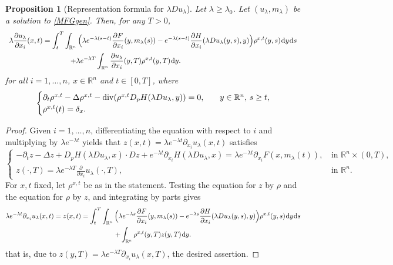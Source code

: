 \documentclass{amsart}
\newtheorem{prop}[thm]{Proposition}
\theoremstyle{remark}
\theoremstyle{definition}
\theoremstyle{Claim}
\newcommand{\R}{\mathbb{R}}
\newcommand{\dd}{\hspace{0.7pt}{\rm d}}
\theoremstyle{plain}
\begin{document}
	\begin{prop}[Representation formula for $\lambda Du_\lambda$]
		Let $\lambda\ge\lambda_0$. Let $(u_\lambda,m_\lambda)$ be a solution to \eqref{MFGgen}.
		Then, for any $T>0$,
		\begin{equation}\label{deru3gen}
				\begin{array}{l}
					\vspace{0.2cm}\displaystyle{\lambda \frac{\partial u_\lambda}{\partial x_i} (x,t)  = \int_{t}^{T}  \int_{\R^n} \Big(\lambda e^{-\lambda (s-t)} \frac{\partial F}{\partial x_i}(y,m_\lambda(s)) - e^{-\lambda (s-t)}\frac{\partial H}{\partial x_i} (\lambda Du_\lambda(y,s),y) \Big) \rho^{x, t}(y,s) \dd y \dd s}\\
					\displaystyle{\hspace{3cm}+\lambda e^{-\lambda T}\int_{\mathbb{R}^n}\frac{\partial u_\lambda}{\partial x_i}(y,T)\rho^{x, t}(y,T)\dd y}.
				\end{array}
		\end{equation}
			for all $i=1,\dots,n$, $x\in \mathbb{R}^n$ and $t\in [0,T]$, where 
		\[
		\begin{cases}
			\partial_t\rho^{x, t}-\Delta \rho^{x, t}-{ \rm div}(\rho^{x, t}D_pH(\lambda Du_\lambda,y))=0,\quad &y\in \mathbb{R}^n,\,{s\geq t},\\
			\rho^{x, t}(t)=\delta_{x}.
		\end{cases}
		\]
	\end{prop} 
	
	\begin{proof} Given $i=1,\dots,n$, differentiating the equation with respect to $i$ and multiplying by $\lambda e^{-\lambda t}$ yields that $z(x,t) = \lambda e^{-\lambda t}\partial_{x_i} u_\lambda(x,t)$ satisfies
	\[
	\begin{cases}
			-\partial_t z-\Delta z+D_p H(\lambda Du_\lambda,x) \cdot Dz + e^{-\lambda t}\partial_{x_i} H(\lambda Du_\lambda,x) = \lambda e^{-\lambda t} \partial_{x_i} F(x,m_\lambda(t)),\, & \text{in $\mathbb{R}^n \times (0,T)$},\\
			z(\cdot,T)=\lambda e^{-\lambda T}\frac{\partial}{\partial x_i}u_\lambda(\cdot,T),\quad &  \text{in $\mathbb{R}^n$}.
		\end{cases}
	\]
	For $x,t$ fixed, let $\rho^{x,t}$ be as in the statement. Testing the equation for $z$ by $\rho$ and the equation for $\rho$ by $z$, and integrating by parts gives
	\begin{multline*}
		\lambda e^{-\lambda t}\partial_{x_i} u_\lambda(x,t) = z(x,t)= \int_{t}^{T} \int_{\R^n} \Big(\lambda e^{-\lambda s} \frac{\partial F}{\partial x_i} (y,m_\lambda(s)) - e^{-\lambda s}\frac{\partial H}{\partial x_i} (\lambda Du_\lambda(y,s),y) \Big) \rho^{x, t}(y,s) \dd y \dd s\\
		+\int_{\mathbb{R}^n}\rho^{x, t}(y,T)z(y,T)\dd y.
	\end{multline*}
	that is, due to $z(y,T)=\lambda e^{-\lambda T}\partial_{x_i} u_\lambda(x,T)$, the desired assertion.
	\end{proof}
	
\end{document}
